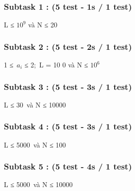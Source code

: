 \subsubsection{   Subtask 1 : (5 test - 1s / 1 test)  }

   L ≤ $10^{9}$   và N ≤ 20  

\subsubsection{   Subtask 2 : (5 test - 2s / 1 test)  }

   1 ≤ $a_{i}$   ≤ 2; L = 10       0      và N ≤ $10^{6}$

\subsubsection{   Subtask 3 : (5 test - 3s / 1 test)  }

   L ≤ 30 và N ≤ 10000  

\subsubsection{   Subtask 4 : (5 test - 3s / 1 test)  }

   L ≤ 5000 và N ≤ 100  

\subsubsection{   Subtask 5 : (5 test - 4s / 1 test)  }

   L ≤ 5000 và N ≤ 10000  

